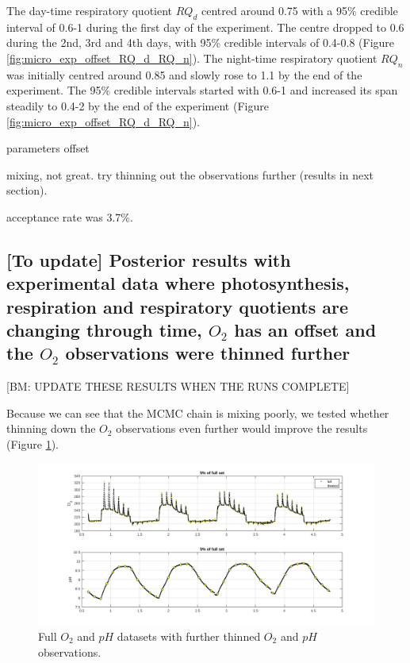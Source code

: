 \documentclass{ruthesis}
\begin{document}
The day-time respiratory quotient $RQ_d$ centred around 0.75 with a 95\% credible interval of 0.6-1 during the first day of the experiment. The centre dropped to 0.6 during the 2nd, 3rd and 4th days, with 95\% credible intervals of 0.4-0.8 (Figure \ref{fig:micro_exp_offset_RQ_d_RQ_n}). The night-time respiratory quotient $RQ_n$ was initially centred around 0.85 and slowly rose to 1.1 by the end of the experiment. The 95\% credible intervals started with 0.6-1 and increased its span steadily to 0.4-2 by the end of the experiment (Figure \ref{fig:micro_exp_offset_RQ_d_RQ_n}).

parameters
offset

mixing, not great. try thinning out the observations further (results in next section).

acceptance rate was 3.7\%.





\FloatBarrier
\subsection{[To update] Posterior results with experimental data where photosynthesis, respiration and respiratory quotients are changing through time, $O_2$ has an offset and the $O_2$ observations were thinned further}

[BM: UPDATE THESE RESULTS WHEN THE RUNS COMPLETE]

Because we can see that the MCMC chain is mixing poorly, we tested whether thinning down the $O_2$ observations even further would improve the results (Figure \ref{fig:thinned_obs_further_micro}).

\begin{figure}
	\centerline{\includegraphics[width=1.25\textwidth]{images_microalgae/plots/thinned_obs_micro_further}}
	\caption[.]{Full $O_2$ and $pH$ datasets with further thinned $O_2$ and $pH$ observations.}
	\label{fig:thinned_obs_further_micro}
\end{figure}
\end{document}
